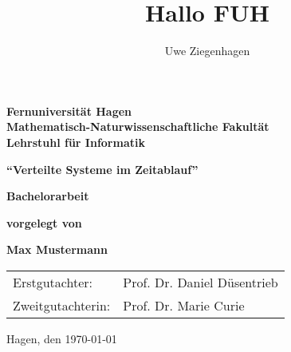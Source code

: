\documentclass[12pt,ngerman,parskip=half]{scrbook}
\title{Hallo FUH}
\author{Uwe Ziegenhagen}
\begin{document}
\begin{titlepage}
{\large\bfseries Fernuniversität Hagen \\
Mathematisch-Naturwissenschaftliche Fakultät \\
Lehrstuhl für Informatik}

\vspace*{5cm}
\begin{center}
{\LARGE\bfseries\enquote{Verteilte Systeme im Zeitablauf}}
\end{center}

\vspace*{1cm}
\begin{center}
{\Large\bfseries Bachelorarbeit}
\end{center}


\begin{center}
{\large\bfseries  vorgelegt von }
\end{center}

\begin{center}
{\Large\bfseries Max Mustermann}
\end{center}


\vfill
\begin{tabular}{ll}
Erstgutachter: & Prof. Dr. Daniel Düsentrieb \\
Zweitgutachterin: & Prof. Dr. Marie Curie \\
\end{tabular}

\hfill Hagen, den \today
\end{titlepage}



\tableofcontents

\listoffigures







\end{document}
